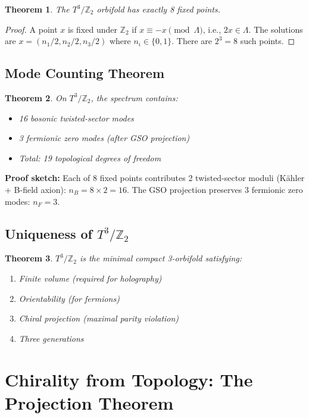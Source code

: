 \documentclass[12pt,a4paper]{article}
\newtheorem{theorem}{Theorem}[section]
\newcommand{\Ztwo}{\mathbb{Z}_2}
\newcommand{\Tthree}{T^3}
\newcommand{\nB}{n_B}
\newcommand{\nF}{n_F}
\begin{document}
\begin{theorem}
The $\Tthree/\Ztwo$ orbifold has exactly 8 fixed points.
\end{theorem}

\begin{proof}
A point $x$ is fixed under $\Ztwo$ if $x \equiv -x \pmod{\Lambda}$, i.e., $2x \in \Lambda$. The solutions are $x = (n_1/2, n_2/2, n_3/2)$ where $n_i \in \{0,1\}$. There are $2^3 = 8$ such points.
\end{proof}

\subsection{Mode Counting Theorem}

\begin{theorem}
On $\Tthree/\Ztwo$, the spectrum contains:
\begin{itemize}
    \item 16 bosonic twisted-sector modes
    \item 3 fermionic zero modes (after GSO projection)
    \item Total: 19 topological degrees of freedom
\end{itemize}
\end{theorem}

\textbf{Proof sketch:} Each of 8 fixed points contributes 2 twisted-sector moduli (K\"ahler + B-field axion): $\nB = 8 \times 2 = 16$. The GSO projection preserves 3 fermionic zero modes: $\nF = 3$.

\subsection{Uniqueness of $\Tthree/\Ztwo$}

\begin{theorem}
$\Tthree/\Ztwo$ is the minimal compact 3-orbifold satisfying:
\begin{enumerate}
    \item Finite volume (required for holography)
    \item Orientability (for fermions)
    \item Chiral projection (maximal parity violation)
    \item Three generations
\end{enumerate}
\end{theorem}

\section{Chirality from Topology: The Projection Theorem}
\label{sec:chirality}
\end{document}
